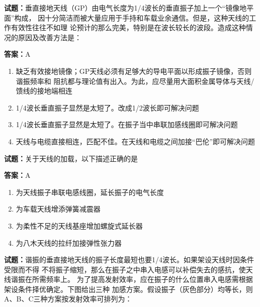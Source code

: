 \documentclass{ctexbook}
\begin{document}
\textbf{试题：}垂直接地天线（GP）由电气长度为1/4波长的垂直振子加上一个“镜像地平面”构成，
因十分简洁而被大量应用于手持和车载业余通信。但是，这种天线的工作有效性往往不如理
论预计的那么完美，特别是在波长较长的波段。造成这种情况的原因及改善方法是： 

\textbf{答案：}A 

\begin{enumerate}[leftmargin=3em]
  \item 缺乏有效接地镜像；GP天线必须有足够大的导电平面以形成振子镜像，否则谐振频率和
阻抗都与理论值有出入。为此，应尽量用大面积金属导体与天线/馈线的接地端相连 

  \item 1/4波长垂直振子显然是太短了。改成1/2波长即可解决问题 

  \item 1/4波长垂直振子显然是太短了。在振子当中串联加感线圈即可解决问题 

  \item 天线与电缆直接相连，匹配不佳。在天线和电缆之间加接“巴伦”即可解决问题 

\end{enumerate}





\vspace{1em}

\textbf{试题：}关于天线的加载，以下描述正确的是 

\textbf{答案：}A 

\begin{enumerate}[leftmargin=3em]
  \item 为天线振子串联电感线圈，延长振子的电气长度 

  \item 为车载天线增添弹簧减震器 

  \item 为柔性不足的天线基座增加螺旋式延长器 


  \item 为八木天线的拉纤加接弹性张力器 

\end{enumerate}





\vspace{1em}

\textbf{试题：}谐振的垂直接地天线的振子长度最短也要1/4波长。如果架设天线时因条件受限而不得
不将振子缩短，那么在振子之中串入电感可以补偿失去的感抗，使天线谐振在所需频率上。
为了提高发射效率，应在振子的什么位置串入电感需根据架设条件择优确定。下图给出三种
加感方案。假设振子（灰色部分）均等长，则A、B、C三种方案按发射效率可排列为： 
\end{document}
